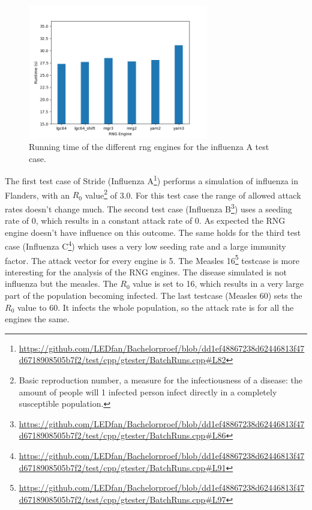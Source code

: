 \documentclass{acmart}
\begin{document}
\begin{figure}
    \centering
    \includegraphics[width=0.7\textwidth]{images/engine_performance_bar.png}
    \caption{Running time of the different rng engines for the influenza A test case.}
    \label{fig:engine:running}
\end{figure}


The first test case of Stride (Influenza A\footnote{\url{https://github.com/LEDfan/Bachelorproef/blob/dd1ef48867238d62446813f47d6718908505b7f2/test/cpp/gtester/BatchRuns.cpp\#L82}})
performs a simulation of influenza in Flanders, with an $R_0$ value\footnote{Basic reproduction number, a measure for the infectiousness of a disease: the amount of people will 1 infected person infect directly in a completely
susceptible population.} of 3.0. For this test case the range of allowed attack rates doesn't change much. 
The second test case (Influenza B\footnote{\url{https://github.com/LEDfan/Bachelorproef/blob/dd1ef48867238d62446813f47d6718908505b7f2/test/cpp/gtester/BatchRuns.cpp\#L86}}) uses a seeding rate of 0, which results in a constant attack rate of 0. As expected the RNG engine doesn't have influence on this outcome.
The same holds for the third test case (Influenza C\footnote{\url{https://github.com/LEDfan/Bachelorproef/blob/dd1ef48867238d62446813f47d6718908505b7f2/test/cpp/gtester/BatchRuns.cpp\#L91}}) which uses a very low seeding rate and a large immunity factor. The attack vector for every engine is 5.
The Measles 16\footnote{\url{https://github.com/LEDfan/Bachelorproef/blob/dd1ef48867238d62446813f47d6718908505b7f2/test/cpp/gtester/BatchRuns.cpp\#L97}} testcase is more interesting for the analysis of the RNG engines. The disease simulated is not influenza but the measles. The $R_0$ value is set to 16, which results in a very large part of the population becoming infected.
The last testcase (Measles 60) sets the $R_0$ value to 60. It infects the whole population, so the attack rate is for all the engines the same.
    
\end{document}
